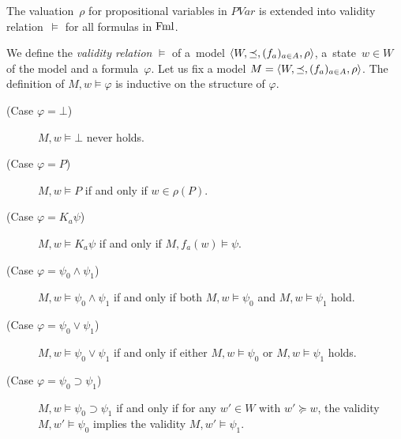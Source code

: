 The valuation~$\rho$ for propositional variables in $PVar$ is extended into validity
relation~$\models$ for all formulas in $\operatorname{Fml}$.
\begin{definition}
 We define the \textit{validity relation} $\models$ of a~model
 $\langle{W,\preceq,(f_a)_{a\in A},\rho}\rangle$, a~state~$w\in W$ of the model and a
 formula~$\varphi$.
 Let us fix a model $M=\langle{W,\preceq,(f_a)_{a\in A},\rho}\rangle$.
\newcommand{\m}{M}
 The definition of $M,w\models\varphi$ is inductive on the structure of $\varphi$.
\begin{description}
 \item[(Case $\varphi=\bot$)] $\m, w\models \bot$ never holds.
\item[(Case $\varphi= P$)] $\m, w\models P$ if and only if 
$w \in
 \rho(P)$.
 \item[(Case $\varphi = K_a \psi$)] 
	    $\m, w\models K_a \psi$ if and only if
	    $\m, f_a(w)\models \psi$.
\item[(Case $\varphi = \psi_0\wedge\psi_1$)]
 $\m, w\models \psi_0\wedge\psi_1$ if and only if both
 $\m, w\models \psi_0$ and $\m,w\models \psi_1$ hold.
\item[(Case $\varphi = \psi_0\vee\psi_1$)]
 $\m, w\models \psi_0\vee\psi_1$ if and only if either
 $\m, w\models \psi_0$ or $\m,w\models \psi_1$ holds.
\item[(Case $\varphi = \psi_0\supset \psi_1$)]
	   $\m, w\models \psi_0\supset\psi_1$ if and only if 
	   for any $w'\in W$ with $w'\succeq w$, the validity $M,w'\models \psi_0$ implies
	   the validity $M, w'\models
	   \psi_1$.
\end{description}
\end{definition}

